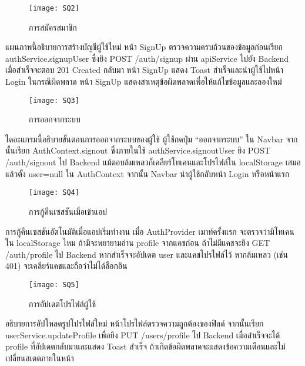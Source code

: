 \newpage

\begin{figure}[h]
	\centering
	\texttt{[image: SQ2]}
	\caption{การสมัครสมาชิก}
\end{figure}

\indent แผนภาพนี้อธิบายการสร้างบัญชีผู้ใช้ใหม่ หน้า SignUp ตรวจความครบถ้วนของข้อมูลก่อนเรียก authService.signupUser ซึ่งยิง POST /auth/signup ผ่าน apiService ไปยัง Backend เมื่อสำเร็จจะตอบ 201 Created กลับมา หน้า SignUp แสดง Toast สำเร็จและนำผู้ใช้ไปหน้า Login ในกรณีผิดพลาด หน้า SignUp แสดงสาเหตุข้อผิดพลาดเพื่อให้แก้ไขข้อมูลและลองใหม่


\newpage

\vspace{\baselineskip}

\begin{figure}[h]
	\centering
	\texttt{[image: SQ3]}
	\caption{การออกจากระบบ}
\end{figure}

\indent ไดอะแกรมนี้อธิบายขั้นตอนการออกจากระบบของผู้ใช้ ผู้ใช้กดปุ่ม “ออกจากระบบ” ใน Navbar จากนั้นเรียก AuthContext.signout ซึ่งภายในใช้ authService.signoutUser ยิง POST /auth/signout ไป Backend แม้ตอบล้มเหลวก็เคลียร์โทเคนและโปรไฟล์ใน localStorage เสมอ แล้วตั้ง user=null ใน AuthContext จากนั้น Navbar นำผู้ใช้กลับหน้า Login หรือหน้าแรก

\newpage

\vspace{\baselineskip}

\begin{figure}[h]
	\centering
	\texttt{[image: SQ4]}
	\caption{การกู้คืนเซสชันเมื่อเข้าแอป}
\end{figure}

\indent การกู้คืนเซสชันอัตโนมัติเมื่อแอปเริ่มทำงาน เมื่อ AuthProvider เมาท์ครั้งแรก จะตรวจว่ามีโทเคนใน localStorage ไหม ถ้ามีจะพยายามอ่าน profile จากแคชก่อน ถ้าไม่มีแคชจะยิง GET /auth/profile ไป Backend หากสำเร็จจะอัปเดต user และแคชโปรไฟล์ไว้ หากล้มเหลว (เช่น 401) จะเคลียร์แคชและถือว่าไม่ได้ล็อกอิน

\vspace{\baselineskip}

\begin{figure}[h]
	\centering
	\texttt{[image: SQ5]}
	\caption{การอัปเดตโปรไฟล์ผู้ใช้}
\end{figure}

\indent อธิบายการอัปโหลดรูปโปรไฟล์ใหม่ หน้าโปรไฟล์ตรวจความถูกต้องของฟิลด์ จากนั้นเรียก userService.updateProfile เพื่อยิง PUT /users/profile ไป Backend เมื่อสำเร็จจะได้ profile ที่อัปเดตกลับมาและแสดง Toast สำเร็จ ถ้าเกิดข้อผิดพลาดจะแสดงข้อความเตือนและไม่เปลี่ยนสเตตภายในหน้า



